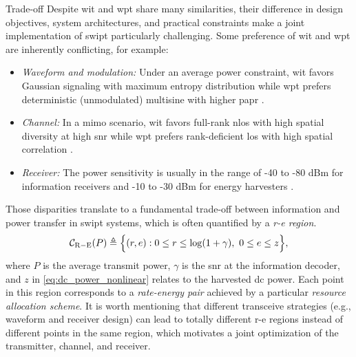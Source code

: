 \begin{section}{}
	\begin{subsection}{ Trade-off}
		Despite \gls{wit} and \gls{wpt} share many similarities, their difference in design objectives, system architectures, and practical constraints make a joint implementation of \gls{swipt} particularly challenging.
		Some preference of \gls{wit} and \gls{wpt} are inherently conflicting, for example:
		\begin{itemize}
			\item \emph{Waveform and modulation:} Under an average power constraint, \gls{wit} favors Gaussian signaling with maximum entropy distribution \cite{Cover2005} while \gls{wpt} prefers deterministic (unmodulated) multisine with higher \gls{papr} \cite{Trotter2009}.
			\item \emph{Channel:} In a \gls{mimo} scenario, \gls{wit} favors full-rank \gls{nlos} with high spatial diversity at high \gls{snr} while \gls{wpt} prefers rank-deficient \gls{los} with high spatial correlation \cite{Wu2022a}.
			\item \emph{Receiver:} The power sensitivity is usually in the range of -40 to -80 dBm for information receivers and -10 to -30 dBm for energy harvesters \cite{Lu2015}.
		\end{itemize}
		Those disparities translate to a fundamental trade-off between information and power transfer in \gls{swipt} systems, which is often quantified by a \emph{\gls{r-e} region}.
		\begin{equation}
			\mathcal{C}_\mathrm{R-E}(P) \triangleq \Bigl\{ (r,e) : 0 \le r \le \log(1 + \gamma), \ 0 \le e \le z \Bigr\},
		\end{equation}
		where $P$ is the average transmit power, $\gamma$ is the \gls{snr} at the information decoder, and $z$ in \eqref{eq:dc_power_nonlinear} relates to the harvested \gls{dc} power.
		Each point in this region corresponds to a \emph{rate-energy pair} achieved by a particular \emph{resource allocation scheme}.
		It is worth mentioning that different transceive strategies (e.g., waveform and receiver design) can lead to totally different \gls{r-e} regions instead of different points in the same region, which motivates a joint optimization of the transmitter, channel, and receiver.
	\end{subsection}


\end{section}
